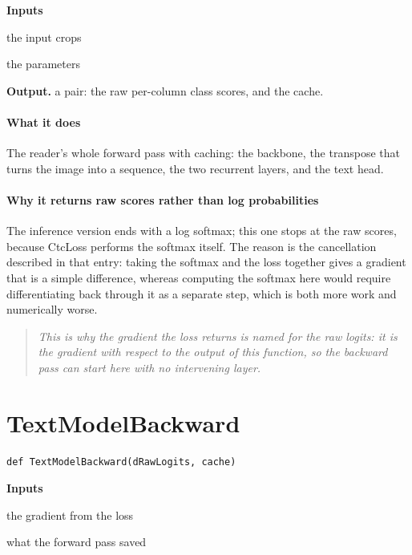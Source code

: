 \noindent\textbf{Inputs}
\begin{description}[leftmargin=2.2em,style=nextline,font=\normalfont\ttfamily]\setlength\itemsep{1pt}
  \item[{x}] \normalfont the input crops
  \item[{params}] \normalfont the parameters
\end{description}

\noindent\textbf{Output.} a pair: the raw per-column class scores, and the cache.


\paragraph{What it does}
The reader's whole forward pass with caching: the backbone, the transpose that turns the image into a sequence, the two recurrent layers, and the text head.


\paragraph{Why it returns raw scores rather than log probabilities}
The inference version ends with a log softmax; this one stops at the raw scores, because CtcLoss performs the softmax itself. The reason is the cancellation described in that entry: taking the softmax and the loss together gives a gradient that is a simple difference, whereas computing the softmax here would require differentiating back through it as a separate step, which is both more work and numerically worse.


\begin{quote}\small\itshape This is why the gradient the loss returns is named for the raw logits: it is the gradient with respect to the output of this function, so the backward pass can start here with no intervening layer.\end{quote}

\section{TextModelBackward}
\begin{lstlisting}[style=sig]
def TextModelBackward(dRawLogits, cache)
\end{lstlisting}

\noindent\textbf{Inputs}
\begin{description}[leftmargin=2.2em,style=nextline,font=\normalfont\ttfamily]\setlength\itemsep{1pt}
  \item[{dRawLogits}] \normalfont the gradient from the loss
  \item[{cache}] \normalfont what the forward pass saved
\end{description}

